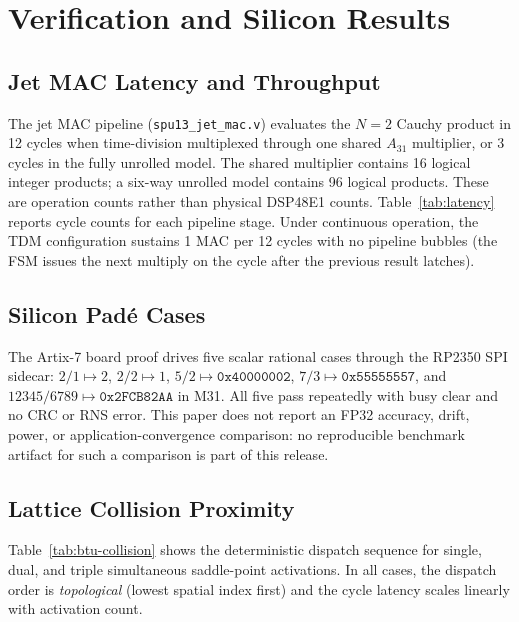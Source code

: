 \documentclass[conference]{IEEEtran}
\begin{document}



\section{Verification and Silicon Results}
\label{sec:results}

\subsection{Jet MAC Latency and Throughput}

The jet MAC pipeline (\texttt{spu13\_jet\_mac.v}) evaluates the $N=2$
Cauchy product in 12 cycles when time-division multiplexed through one
shared $A_{31}$ multiplier, or 3 cycles in the fully unrolled model. The
shared multiplier contains 16 logical integer products; a six-way unrolled
model contains 96 logical products. These are operation counts rather than
physical DSP48E1 counts.
Table~\ref{tab:latency} reports cycle counts for each pipeline stage.
Under continuous operation, the TDM configuration sustains 1 MAC per
12 cycles with no pipeline bubbles (the FSM issues the next multiply
on the cycle after the previous result latches).

\subsection{Silicon Pad\'{e} Cases}

The Artix-7 board proof drives five scalar rational cases through the RP2350
SPI sidecar: $2/1\mapsto2$, $2/2\mapsto1$, $5/2\mapsto\mathtt{0x40000002}$,
$7/3\mapsto\mathtt{0x55555557}$, and
$12345/6789\mapsto\mathtt{0x2FCB82AA}$ in M31. All five pass repeatedly with
busy clear and no CRC or RNS error. This paper does not report an FP32
accuracy, drift, power, or application-convergence comparison: no
reproducible benchmark artifact for such a comparison is part of this
release.

\subsection{Lattice Collision Proximity}

Table~\ref{tab:btu-collision} shows the deterministic dispatch sequence
for single, dual, and triple simultaneous saddle-point activations.
In all cases, the dispatch order is \emph{topological} (lowest spatial
index first) and the cycle latency scales linearly with activation count.
\end{document}
